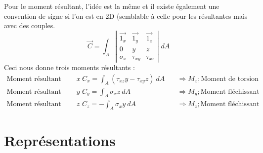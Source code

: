 	Pour le moment résultant, l'idée est la même et il existe également une 
	convention de signe si l'on est en 2D (semblable à celle pour les 
	résultantes mais avec des couples.
	\begin{equation}
	\displaystyle \vec{C} = \int_A\left|\begin{array}{ccc}
	\vec{1_x} & \vec{1_y} & \vec{1_z}\\
	0 & y & z\\
	\sigma_x & \tau_{xy} & \tau_{xz}
	\end{array}\right|\ dA
	\end{equation}
	Ceci nous donne trois moments résultants : 
	\begin{equation}
	\begin{array}{lll}
	\text{Moment résultant selon $x$ : } & \displaystyle C_x = \int_A (
	\tau_{xz}y-\tau_{xy}z)\ dA&\quad\Rightarrow M_x;  \text{Moment de 
	torsion}\\
	\text{Moment résultant selon $y$ : } & \displaystyle C_y = \int_A
	\sigma_xz\ dA&\quad\Rightarrow M_y;  \text{Moment fléchissant}	\\
	\text{Moment résultant selon $z$ : } & \displaystyle C_z = -\int_A
	\sigma_xy\ dA&\quad\Rightarrow M_z;  \text{Moment fléchissant}		
	\end{array}
	\end{equation}
\vspace{-1cm}
\section{Représentations}
